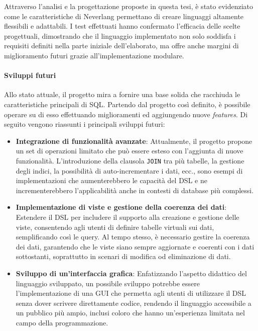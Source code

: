 \documentclass[12pt,a4paper,openright,twoside]{book}
\begin{document}
Attraverso l’analisi e la progettazione proposte in questa tesi, è stato evidenziato come le caratteristiche di Neverlang permettano 
di creare linguaggi altamente flessibili e adattabili. I test effettuati hanno confermato l’efficacia delle scelte progettuali, 
dimostrando che il linguaggio implementato non solo soddisfa i requisiti definiti nella parte iniziale dell’elaborato, ma offre 
anche margini di miglioramento futuri grazie all’implementazione modulare.

\paragraph{Sviluppi futuri}
Allo stato attuale, il progetto mira a fornire una base solida che racchiuda le caratteristiche principali di SQL. Partendo dal 
progetto così definito, è possibile operare su di esso effettuando miglioramenti ed aggiungendo nuove \textit{features}. Di seguito 
vengono riassunti i principali sviluppi futuri:
\begin{itemize}
    \item \textbf{Integrazione di funzionalità avanzate}: Attualmente, il progetto propone un set di operazioni limitato che può 
    essere esteso con l’aggiunta di nuove funzionalità. L’introduzione della clausola \texttt{JOIN} tra più tabelle, la gestione 
    degli indici, la possibilità di auto-incrementare i dati, ecc., sono esempi di implementazioni che aumenterebbero le capacità 
    del DSL e ne incrementerebbero l’applicabilità anche in contesti di database più complessi.
    \item \textbf{Implementazione di viste e gestione della coerenza dei dati}: Estendere il DSL per includere il supporto alla 
    creazione e gestione delle viste, consentendo agli utenti di definire tabelle virtuali sui dati, semplificando così le query. 
    Al tempo stesso, è necessario gestire la coerenza dei dati, garantendo che le viste siano sempre aggiornate e coerenti con i 
    dati sottostanti, soprattutto in scenari di modifica od eliminazione di dati.
    \item \textbf{Sviluppo di un’interfaccia grafica}: Enfatizzando l’aspetto didattico del linguaggio sviluppato, un possibile 
    sviluppo potrebbe essere l’implementazione di una \ac{GUI} che permetta agli utenti di utilizzare il DSL senza dover scrivere 
    direttamente codice, rendendo il linguaggio accessibile a un pubblico più ampio, inclusi coloro che hanno un’esperienza 
    limitata nel campo della programmazione.
\end{itemize}
\end{document}
